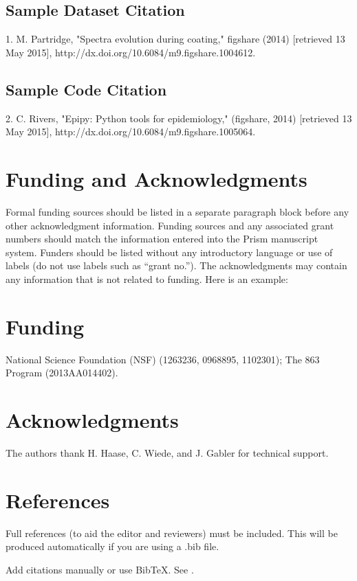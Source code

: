 \documentclass[9pt,twocolumn,twoside]{osajnl}
\begin{document}
\subsection{Sample Dataset Citation}

1. M. Partridge, "Spectra evolution during coating," figshare (2014) [retrieved 13 May 2015], http://dx.doi.org/10.6084/m9.figshare.1004612.

\subsection{Sample Code Citation}

2. C. Rivers, "Epipy: Python tools for epidemiology," (figshare, 2014) [retrieved 13 May 2015], http://dx.doi.org/10.6084/m9.figshare.1005064.

\section{Funding and Acknowledgments}

Formal funding sources should be listed in a separate paragraph block before any other acknowledgment information. Funding sources and any associated grant numbers should match the information entered into the Prism manuscript system. Funders should be listed without any introductory language or use of labels (do not use labels such as “grant no.”). The acknowledgments may contain any information that is not related to funding. Here is an example:

\section*{Funding}National Science Foundation (NSF) (1263236, 0968895, 1102301); The 863 Program (2013AA014402).


\section*{Acknowledgments}The authors thank H. Haase, C. Wiede, and J. Gabler for technical support.

\section{References}

Full references (to aid the editor and reviewers) must be included. This will be produced automatically if you are using a .bib file.

\bigskip
\noindent Add citations manually or use BibTeX. See \cite{Chitimalla:17,Wen:16}.
\end{document}
